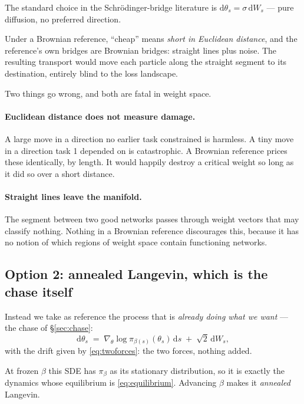 \documentclass[11pt]{article}
\theoremstyle{definition}
\theoremstyle{plain}
\theoremstyle{remark}
\begin{document}
The standard choice in the Schr\"odinger-bridge literature is
$\mathrm{d}\theta_s = \sigma\,\mathrm{d}W_s$ --- pure diffusion, no preferred
direction.

Under a Brownian reference, ``cheap'' means \emph{short in Euclidean distance},
and the reference's own bridges are Brownian bridges: straight lines plus noise.
The resulting transport would move each particle along the straight segment to
its destination, entirely blind to the loss landscape.

Two things go wrong, and both are fatal in weight space.

\paragraph{Euclidean distance does not measure damage.}
A large move in a direction no earlier task constrained is harmless. A tiny move
in a direction task 1 depended on is catastrophic. A Brownian reference prices
these identically, by length. It would happily destroy a critical weight so long
as it did so over a short distance.

\paragraph{Straight lines leave the manifold.}
The segment between two good networks passes through weight vectors that may
classify nothing. Nothing in a Brownian reference discourages this, because it
has no notion of which regions of weight space contain functioning networks.

\subsection{Option 2: annealed Langevin, which is the chase itself}

Instead we take as reference the process that is \emph{already doing what we
want} --- the chase of \S\ref{sec:chase}:
\begin{equation}
\mathrm{d}\theta_s \;=\; \nabla_\theta \log \pi_{\beta(s)}(\theta_s)\,\mathrm{d}s
\;+\; \sqrt{2}\,\mathrm{d}W_s,
\label{eq:reference}
\end{equation}
with the drift given by \eqref{eq:twoforces}: the two forces, nothing added.

At frozen $\beta$ this SDE has $\pi_\beta$ as its stationary distribution, so it
is exactly the dynamics whose equilibrium is \eqref{eq:equilibrium}. Advancing
$\beta$ makes it \emph{annealed} Langevin.
\end{document}
